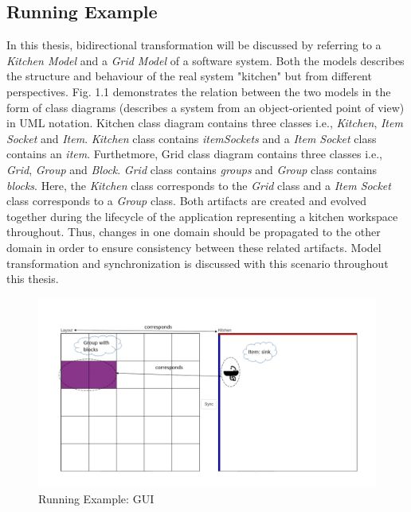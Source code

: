 \subsection{Running Example}\label{subsec:runningexample}
In this thesis, bidirectional transformation will be discussed by referring to a \textit{Kitchen Model} and a \textit{Grid Model} of a software system. Both the models describes the structure and behaviour of the real system "kitchen" but from different perspectives.
\newline\newline Fig. 1.1 demonstrates the relation between the two models in the form of class diagrams (describes a system from an object-oriented point of view) in UML notation. Kitchen class diagram contains three classes i.e., \textit{Kitchen}, \textit{Item Socket} and \textit{Item}. \textit{Kitchen} class contains \textit{itemSockets} and a \textit{Item Socket} class contains an \textit{item}.
Furthetmore, Grid class diagram contains three classes i.e., \textit{Grid}, \textit{Group} and \textit{Block}. \textit{Grid} class contains \textit{groups} and \textit{Group} class contains \textit{blocks}. Here, the \textit{Kitchen} class corresponds to the \textit{Grid} class and a \textit{Item Socket} class corresponds to a \textit{Group} class. 
\newline\newline Both artifacts are created and evolved together during
the lifecycle of the application representing a kitchen workspace throughout. Thus, changes in
one domain should be propagated to the other domain in order to ensure consistency
between these related artifacts. Model transformation and synchronization is discussed with this scenario throughout this thesis. 

\begin{figure}
	\includegraphics[width=1\textwidth]{figures/KitchenToGrid}
	\caption{Running Example: GUI}
	\label{fig:Running_Example_GUI}
\end{figure}

